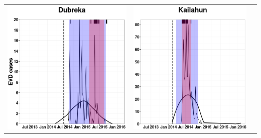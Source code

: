 \documentclass[portrait,a0paper,fontscale=0.315]{baposter}
\begin{document}
\begin{poster}
{\begin{tabular}{ccc}
 \includegraphics[scale=0.34,valign=c]{images/maxCases_Dubreka.png} &
 \includegraphics[scale=0.34,valign=c]{images/maxCases_Kailahun.png}&

\end{tabular}}
\end{poster}
\end{document}

